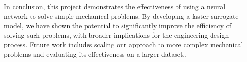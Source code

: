 \documentclass[oneside,a4paper,english,links]{amca}
\begin{document}
In conclusion, this project demonstrates the effectiveness of using a neural network to solve simple mechanical problems. By developing a faster surrogate model, we have shown the potential to significantly improve the efficiency of solving such problems, with broader implications for the engineering design process. Future work includes scaling our approach to more complex mechanical problems and evaluating its effectiveness on a larger dataset.\cite{zienkiewicz91}.


\end{document}
